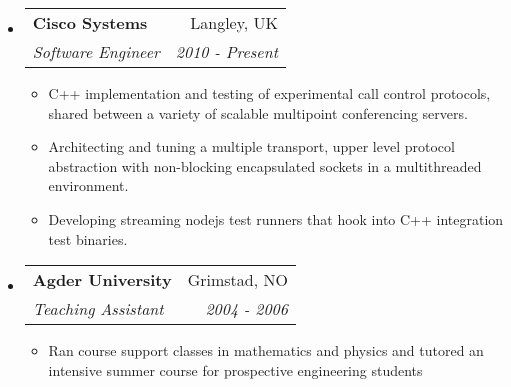\documentclass[letterpaper,11pt]{article}
\makeatletter
\newcommand{\resitem}[1]{\item #1 \vspace{-2pt}}
\newcommand{\resheading}[1]{\parbox{\textwidth}{\begin{shaded}\textbf{\sffamily{\mbox{~}{\large #1}\vphantom{p\^{E}}}}\end{shaded}}}
\newcommand{\ressubheading}[4]{
\begin{tabular*}{6.5in}{l@{\extracolsep{\fill}}r}
		\textbf{#1} & #2 \\
		\textit{#3} & \textit{#4} \\
\end{tabular*}\vspace{-6pt}}
\makeatother
\begin{document}
\resheading{Employment}
\begin{itemize}
  \item
    \ressubheading{Cisco Systems}{Langley, UK}{Software Engineer}{2010 - Present}
    \begin{itemize}
      \resitem{C++ implementation and testing of experimental call control protocols, shared between a variety of scalable multipoint conferencing servers.}
      \resitem{Architecting and tuning a multiple transport, upper level protocol abstraction with non-blocking encapsulated sockets in a multithreaded environment.}
      \resitem{Developing streaming nodejs test runners that hook into C++ integration test binaries.}
    \end{itemize}
  \item
    \ressubheading{Agder University}{Grimstad, NO}{Teaching Assistant}{2004 - 2006}
    \begin{itemize}
      \resitem{Ran course support classes in mathematics and physics and tutored an intensive summer course for prospective engineering students}
    \end{itemize}
\end{itemize}
\end{document}
